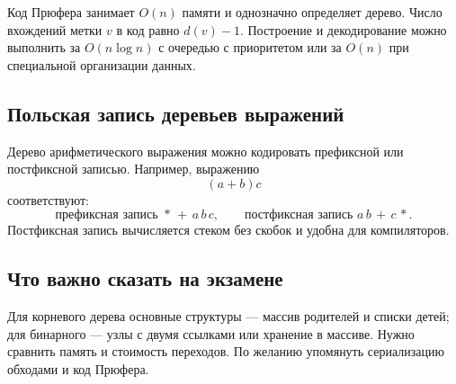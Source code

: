 Код Прюфера занимает $O(n)$ памяти и однозначно определяет дерево. Число вхождений метки $v$ в код равно $d(v)-1$. Построение и декодирование можно выполнить за $O(n\log n)$ с очередью с приоритетом или за $O(n)$ при специальной организации данных.

\subsection{Польская запись деревьев выражений}

Дерево арифметического выражения можно кодировать префиксной или постфиксной записью. Например, выражению
\[
    (a+b)c
\]
соответствуют:
\[
    \text{префиксная запись } *\,+\,a\,b\,c,
    \qquad
    \text{постфиксная запись } a\,b\,+\,c\,*.
\]
Постфиксная запись вычисляется стеком без скобок и удобна для компиляторов.

\subsection{Что важно сказать на экзамене}

Для корневого дерева основные структуры --- массив родителей и списки детей; для бинарного --- узлы с двумя ссылками или хранение в массиве. Нужно сравнить память и стоимость переходов. По желанию упомянуть сериализацию обходами и код Прюфера.

\newpage
